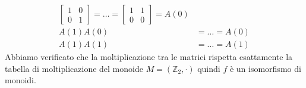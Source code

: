 \documentclass[../main.tex]{subfiles}
\begin{document}
\begin{example}
\begin{align*}
        \begin{bmatrix}
            1 & 0 \\
            0 & 1
        \end{bmatrix}
        = \ldots
        = \begin{bmatrix}
              1 & 1 \\
              0 & 0
          \end{bmatrix}
        = A(0)                      \\
        A(1)A(0) & = \ldots = A(0)  \\
        A(1)A(1) & = \ldots = A(1)
    \end{align*}
    Abbiamo verificato che la moltiplicazione tra le matrici rispetta esattamente la tabella di moltiplicazione del monoide $M = (\mathbb{Z}_2, \cdot)$ quindi $f$ è un isomorfismo di monoidi.


\end{example}
\end{document}
